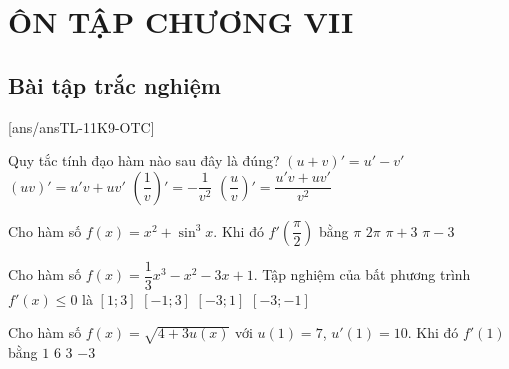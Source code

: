 \section*{ÔN TẬP CHƯƠNG VII}
\subsection{Bài tập trắc nghiệm}
[ans/ansTL-11K9-OTC]
\begin{ex}%
Quy tắc tính đạo hàm nào sau đây là đúng?
\choice 
{$(u+v)'=u'-v'$}
{\True $(uv)'=u'v+uv'$}
{ $\left(\dfrac{1}{v}\right)'=-\dfrac{1}{v^2}$}
{$\left(\dfrac{u}{v}\right)'=\dfrac{u'v+uv'}{v^2}$}
\end{ex}
\begin{ex}%
Cho hàm số $f(x)=x^2+\sin^3 x$. Khi đó $f'\left(\dfrac{\pi}{2}\right)$ bằng
\choice 
{\True $\pi$}
{ $2\pi$}
{$\pi +3$}
{$\pi -3$}
\end{ex}
\begin{ex}%
Cho hàm số $f(x)=\dfrac{1}{3}x^3-x^2-3x+1$. Tập nghiệm của bất phương trình $f'(x)\leq 0$ là
\choice
{$[1;3]$}
{\True $[-1;3]$}
{$[-3;1]$}
{$[-3;-1]$}
\end{ex}
\begin{ex}%
Cho hàm số $f(x)=\sqrt{4+3u(x)}$ với $u(1)=7$, $u'(1)=10$. Khi đó $f'(1)$ bằng
\choice 
{$1$}
{$6$}
{\True $3$}
{$-3$}
\end{ex}
